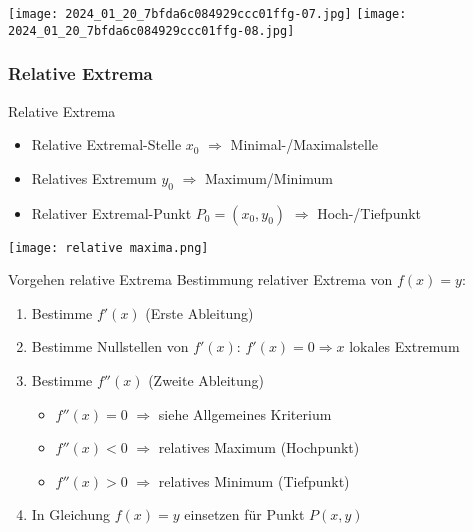 \begin{center}
\texttt{[image: 2024\_01\_20\_7bfda6c084929ccc01ffg-07.jpg]}
\texttt{[image: 2024\_01\_20\_7bfda6c084929ccc01ffg-08.jpg]}
\end{center}

\subsubsection{Relative Extrema}

\begin{definition}{Relative Extrema}
    \begin{itemize}
      \item Relative Extremal-Stelle $x_0$ $\Longrightarrow$ Minimal-/Maximalstelle
      \item Relatives Extremum $y_0$ $\Longrightarrow$ Maximum/Minimum
      \item Relativer Extremal-Punkt $P_0 = (x_0, y_0)$ $\Longrightarrow$ Hoch-/Tiefpunkt
    \end{itemize}
\end{definition}

\begin{center}
\texttt{[image: relative maxima.png]}
\end{center}

\begin{KR}{Vorgehen relative Extrema}
    Bestimmung relativer Extrema von $f(x) = y$:
    \begin{enumerate}
	    \item Bestimme $f'(x)$ (Erste Ableitung)
	    \item Bestimme Nullstellen von $f'(x)$: $f'(x) = 0 \Rightarrow x$ lokales Extremum
	    \item Bestimme $f''(x)$ (Zweite Ableitung)
		    \begin{itemize}
			    \item $f''(x) = 0$ $\Rightarrow$ siehe Allgemeines Kriterium
			    \item $f''(x) < 0$ $\Rightarrow$ relatives Maximum (Hochpunkt)
			    \item $f''(x) > 0$ $\Rightarrow$ relatives Minimum (Tiefpunkt)
		    \end{itemize}
        \item In Gleichung $f(x) = y$ einsetzen für Punkt $P(x, y)$
    \end{enumerate}
\end{KR}

